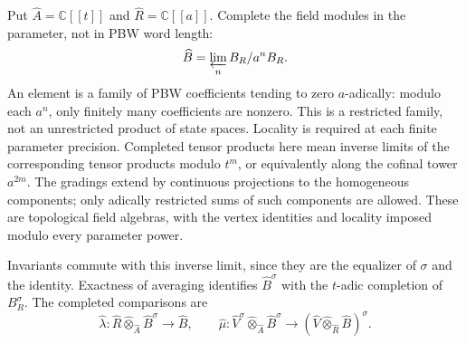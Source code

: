 Put $\widehat A=\mathbb C[[t]]$ and $\widehat R=\mathbb C[[a]]$.
Complete the field modules in the parameter, not in PBW word length:
\[
 \widehat B=\varprojlim_n B_R/a^nB_R.
\]
An element is a family of PBW coefficients tending to zero
$a$-adically: modulo each $a^n$, only finitely many coefficients
are nonzero. This is a restricted family, not an unrestricted product
of state spaces. Locality is required at each finite parameter
precision. Completed tensor products here mean inverse limits of the
corresponding tensor products modulo $t^m$, or equivalently along the
cofinal tower $a^{2m}$. The gradings extend by continuous projections
to the homogeneous components; only adically restricted sums of such
components are allowed. These are topological field algebras, with
the vertex identities and locality imposed modulo every parameter power.

Invariants commute with this inverse limit, since they are the
equalizer of $\sigma$ and the identity. Exactness of averaging
identifies $\widehat B^{\sigma}$ with the $t$-adic completion of
$B_R^\sigma$. The completed comparisons are
\[
 \widehat\lambda:\widehat R\widehat\otimes_{\widehat A}
       \widehat B^\sigma\longrightarrow\widehat B,
 \qquad
 \widehat\mu:\widehat V^\sigma\widehat\otimes_{\widehat A}
       \widehat B^\sigma
 \longrightarrow(\widehat V\widehat\otimes_{\widehat R}\widehat B)^\sigma.
\]

